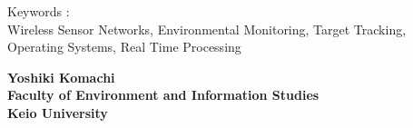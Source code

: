 \vspace{10mm}
Keywords :\\
\hspace{3.5em}Wireless Sensor Networks, Environmental Monitoring, Target Tracking, Operating Systems, Real Time Processing 
\begin{flushright}
\textbf{Yoshiki Komachi}\\
\vspace{5mm}
\textbf{Faculty of Environment and Information Studies}\\
\textbf{Keio University}
\end{flushright}
